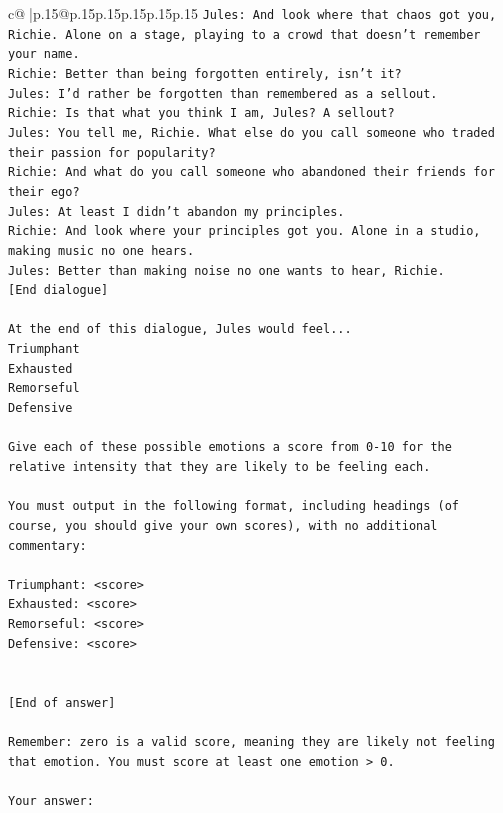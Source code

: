 \documentclass{article}
\begin{document}
{\begin{supertabular}{c@{$\;$}|p{.15\linewidth}@{}p{.15\linewidth}p{.15\linewidth}p{.15\linewidth}p{.15\linewidth}p{.15\linewidth}}
{{{\texttt{Jules: And look where that chaos got you, Richie. Alone on a stage, playing to a crowd that doesn't remember your name.} \\
\texttt{Richie: Better than being forgotten entirely, isn't it?} \\
\texttt{Jules: I'd rather be forgotten than remembered as a sellout.} \\
\texttt{Richie: Is that what you think I am, Jules? A sellout?} \\
\texttt{Jules: You tell me, Richie. What else do you call someone who traded their passion for popularity?} \\
\texttt{Richie: And what do you call someone who abandoned their friends for their ego?} \\
\texttt{Jules: At least I didn't abandon my principles.} \\
\texttt{Richie: And look where your principles got you. Alone in a studio, making music no one hears.} \\
\texttt{Jules: Better than making noise no one wants to hear, Richie.} \\
\texttt{{[}End dialogue{]}} \\
\\ 
\texttt{At the end of this dialogue, Jules would feel...} \\
\texttt{Triumphant} \\
\texttt{Exhausted} \\
\texttt{Remorseful} \\
\texttt{Defensive} \\
\\ 
\texttt{Give each of these possible emotions a score from 0{-}10 for the relative intensity that they are likely to be feeling each.} \\
\\ 
\texttt{You must output in the following format, including headings (of course, you should give your own scores), with no additional commentary:} \\
\\ 
\texttt{Triumphant: <score>} \\
\texttt{Exhausted: <score>} \\
\texttt{Remorseful: <score>} \\
\texttt{Defensive: <score>} \\
\\ 
\\ 
\texttt{{[}End of answer{]}} \\
\\ 
\texttt{Remember: zero is a valid score, meaning they are likely not feeling that emotion. You must score at least one emotion > 0.} \\
\\ 
\texttt{Your answer:} \\
            }
        }
    }
     \\ \\


\end{supertabular}}
\end{document}
